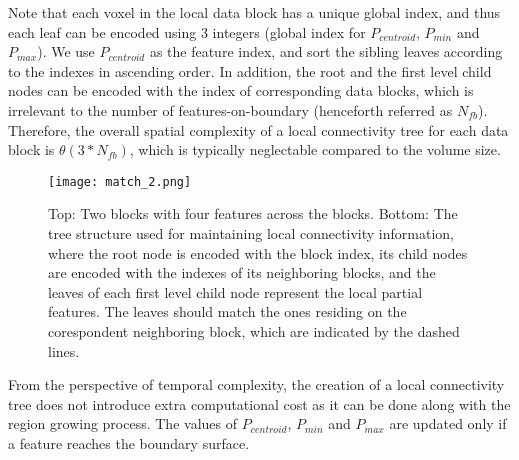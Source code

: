 Note that each voxel in the local data block has a unique global index, and thus each leaf can be encoded using 3 integers (global index for $P_{centroid}$, $P_{min}$ and $P_{max}$). We use $P_{centroid}$ as the feature index, and sort the sibling leaves according to the indexes in ascending order. In addition, the root and the first level child nodes can be encoded with the index of corresponding data blocks, which is irrelevant to the number of features-on-boundary (henceforth referred as $N_{fb}$). Therefore, the overall spatial complexity of a local connectivity tree for each data block is $\theta(3*N_{fb})$, which is typically neglectable compared to the volume size.

\begin{figure}[t]
	\centering
	\texttt{[image: match\_2.png]}
	\caption{Top: Two blocks with four features across the blocks. Bottom: The tree structure used for maintaining local connectivity information, where the root node is encoded with the block index, its child nodes are encoded with the indexes of its neighboring blocks, and the leaves of each first level child node represent the local partial features. The leaves should match the ones residing on the corespondent neighboring block, which are indicated by the dashed lines.}
	\label{fig:match}
\end{figure}

From the perspective of temporal complexity, the creation of a local connectivity tree does not introduce extra computational cost as it can be done along with the region growing process. The values of $P_{centroid}$, $P_{min}$ and $P_{max}$ are updated only if a feature reaches the boundary surface.

